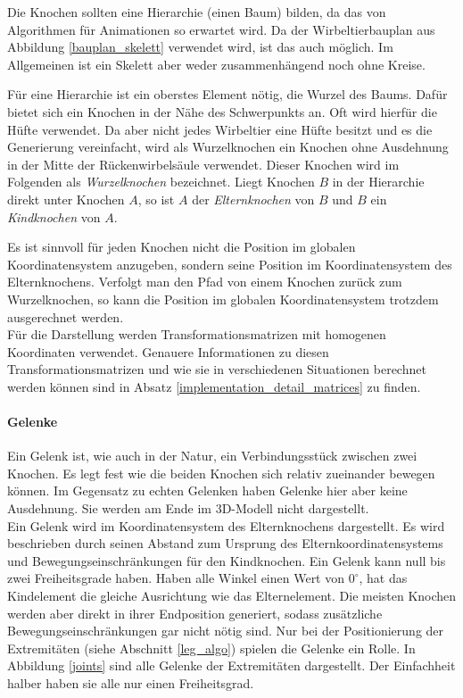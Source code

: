 Die Knochen sollten eine Hierarchie (einen Baum) bilden, da das von Algorithmen für Animationen so erwartet wird.  Da der Wirbeltierbauplan aus Abbildung \ref{bauplan_skelett} verwendet wird, ist das auch möglich. Im Allgemeinen ist ein Skelett aber weder zusammenhängend noch ohne Kreise.

Für eine Hierarchie ist ein oberstes Element nötig, die Wurzel des Baums.
Dafür bietet sich ein Knochen in der Nähe des Schwerpunkts an. Oft wird hierfür die Hüfte verwendet.
Da aber nicht jedes Wirbeltier eine Hüfte besitzt und es die Generierung vereinfacht, wird als Wurzelknochen ein Knochen ohne Ausdehnung in der Mitte der Rückenwirbelsäule verwendet. Dieser Knochen wird im Folgenden als \emph{Wurzelknochen} bezeichnet. Liegt Knochen $B$ in der Hierarchie direkt unter Knochen $A$, so ist $A$ der \emph{Elternknochen} von $B$ und $B$ ein \emph{Kindknochen} von $A$.

Es ist sinnvoll für jeden Knochen nicht die Position im globalen Koordinatensystem anzugeben, sondern seine Position im Koordinatensystem des Elternknochens. Verfolgt man den Pfad von einem Knochen zurück zum Wurzelknochen, so kann die Position im globalen Koordinatensystem trotzdem ausgerechnet werden. \\
Für die Darstellung werden Transformationsmatrizen mit homogenen Koordinaten verwendet. Genauere Informationen zu diesen Transformationsmatrizen und wie sie in verschiedenen Situationen berechnet werden können sind in Absatz \ref{implementation_detail_matrices} zu finden.

\paragraph{Gelenke}
Ein Gelenk ist, wie auch in der Natur, ein Verbindungsstück zwischen zwei Knochen. Es legt fest wie die beiden Knochen sich relativ zueinander bewegen können. Im Gegensatz zu echten Gelenken haben Gelenke hier aber keine Ausdehnung. Sie werden am Ende im 3D-Modell nicht dargestellt.\\
Ein Gelenk wird im Koordinatensystem des Elternknochens dargestellt. Es wird beschrieben durch seinen Abstand zum Ursprung des Elternkoordinatensystems und Bewegungseinschränkungen für den Kindknochen. Ein Gelenk kann null bis zwei Freiheitsgrade haben. Haben alle Winkel einen Wert von $0^\circ$, hat das Kindelement die gleiche Ausrichtung wie das Elternelement. 
Die meisten Knochen werden aber direkt in ihrer Endposition generiert, sodass zusätzliche Bewegungseinschränkungen gar nicht nötig sind. Nur bei der Positionierung der Extremitäten (siehe Abschnitt \ref{leg_algo}) spielen die Gelenke ein Rolle.
In Abbildung \ref{joints} sind alle Gelenke der Extremitäten dargestellt. Der Einfachheit halber haben sie alle nur einen Freiheitsgrad.

